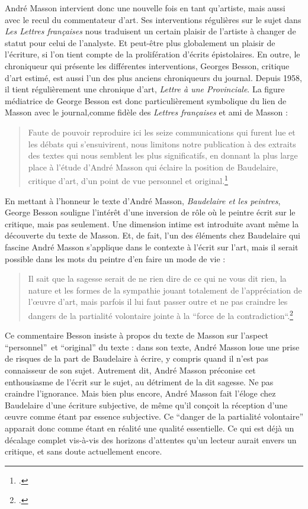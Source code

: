 	 André Masson intervient donc une nouvelle fois en tant qu’artiste, mais aussi avec le recul du commentateur d’art. Ses interventions régulières sur le sujet dans \emph{Les Lettres françaises} nous traduisent un certain plaisir de l’artiste à changer de statut pour celui de l’analyste. Et peut-être plus globalement un plaisir de l’écriture, si l’on tient compte de la prolifération d’écrits épistolaires. En outre, le chroniqueur qui présente les différentes interventions, Georges Besson, critique d’art estimé, est aussi l’un des plus anciens chroniqueurs du journal. Depuis 1958, il tient régulièrement une chronique d’art, \emph{Lettre à une Provinciale}. La figure médiatrice de George Besson est donc particulièrement symbolique du lien de Masson avec le journal,comme fidèle des \emph{Lettres françaises} et ami de Masson :
\begin{quote}
Faute de pouvoir reproduire ici les seize communications qui furent lue et les débats qui s’ensuivirent, nous limitons notre publication à des extraits des textes qui nous semblent les plus significatifs, en donnant la plus large place à l’étude d’André Masson qui éclaire la position de Baudelaire, critique d’art, d’un point de vue personnel et original.\footcite{baudelairepeintres}\end{quote}

	En mettant à l’honneur le texte d’André Masson, \emph{Baudelaire et les peintres}, George Besson souligne l’intérêt d’une inversion de rôle où le peintre écrit sur le critique, mais pas seulement. Une dimension intime est introduite avant même la découverte du texte de Masson. Et, de fait, l’un des éléments chez Baudelaire qui fascine André Masson s’applique dans le contexte à l’écrit sur l’art, mais il serait possible dans les mots du peintre d’en faire un mode de vie : 
\begin{quote}
Il sait que la sagesse serait de ne rien dire de ce qui ne vous dit rien, la nature et les formes de la sympathie jouant totalement de l’appréciation de l’\oe{}uvre d’art, mais parfois il lui faut passer outre et ne pas craindre les dangers de la partialité volontaire jointe à la “force de la contradiction“.\footcite{baudelairepeintres}\end{quote}

Ce commentaire Besson insiste à propos du texte de Masson sur l’aspect \enquote{personnel} et \enquote{original} du texte : dans son texte, André Masson loue une prise de risques de la part de Baudelaire à écrire, y compris quand il n’est pas connaisseur de son sujet. Autrement dit, André Masson préconise cet enthousiasme de l’écrit sur le sujet, au détriment de la dit sagesse. Ne pas craindre l’ignorance. Mais bien plus encore, André Masson fait l’éloge chez Baudelaire d’une écriture subjective, de même qu’il conçoit la réception d’une \oe{}uvre comme étant par essence subjective. Ce \enquote{danger de la partialité volontaire} apparait donc comme étant en réalité une qualité essentielle. Ce qui est déjà un décalage complet vis-à-vis des horizons d’attentes qu’un lecteur aurait envers un critique, et sans doute actuellement encore. 

